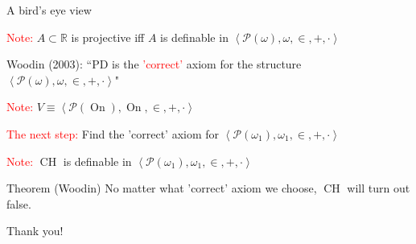 \documentclass{beamer}
\begin{document}
\begin{frame}{A bird's eye view}

  \textcolor<1>{red}{Note:} $A\subset\mathbb R$ is projective iff $A$ is definable in $\left<\mathcal P(\omega),\omega,\in,+,\cdot\right>$\vspace{0.3cm}

  Woodin (2003): ``PD is the \textcolor<2>{red}{'correct'} axiom for the structure $\left<\mathcal P(\omega),\omega,\in,+,\cdot\right>$"\vspace{0.3cm}

  \textcolor<3>{red}{Note:} $V\equiv\left<\mathcal P(\operatorname{On}),\operatorname{On},\in,+,\cdot\right>$\vspace{0.3cm}

   \textcolor<4>{red}{The next step:} Find the 'correct' axiom for $\left<\mathcal P(\omega_1),\omega_1,\in,+,\cdot\right>$\vspace{0.3cm}

   \textcolor<5>{red}{Note:} $\operatorname{CH}$ is definable in $\left<\mathcal P(\omega_1),\omega_1,\in,+,\cdot\right>$

	\begin{block}{Theorem (Woodin)}
		No matter what 'correct' axiom we choose, $\operatorname{CH}$ will turn out false.
	\end{block}
  

\end{frame}

\begin{frame}
  \begin{center}
    \Large{Thank you!}
  \end{center}
\end{frame}
\end{document}
